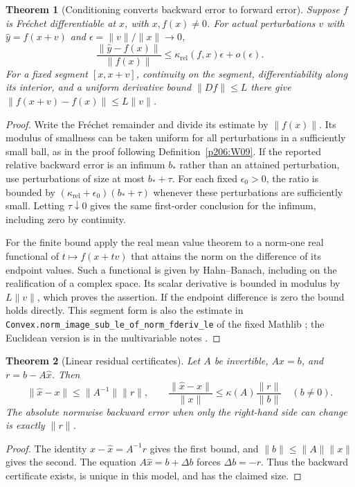 \documentclass[11pt,oneside,openany]{book}
\theoremstyle{plain}
\newtheorem{theorem}{Theorem}[chapter]
\theoremstyle{definition}
\theoremstyle{remark}
\begin{document}
\begin{theorem}[Conditioning converts backward error to forward error]
\label{p206:W13}
Suppose \(f\) is Fr\'echet differentiable at \(x\), with
\(x,f(x)\ne0\). For actual perturbations \(v\) with
\(\hat y=f(x+v)\) and \(\epsilon=\|v\|/\|x\|\to0\),
\[
 \frac{\|\hat y-f(x)\|}{\|f(x)\|}
    \le \kappa_{\mathrm{rel}}(f,x)\epsilon+o(\epsilon).
\]
For a fixed segment \([x,x+v]\), continuity on the segment,
differentiability along its interior, and a uniform derivative
bound \(\|Df\|\le L\) there give
\(\|f(x+v)-f(x)\|\le L\|v\|\).
\end{theorem}
\begin{proof}
Write the Fr\'echet remainder and divide its estimate by
\(\|f(x)\|\). Its modulus of smallness can be taken uniform
for all perturbations in a sufficiently small ball, as in
the proof following Definition~\ref{p206:W09}.
If the reported relative backward error is an infimum \(b_*\)
rather than an attained perturbation, use perturbations of size
at most \(b_*+\tau\). For each fixed \(\epsilon_0>0\), the
ratio is bounded by
\((\kappa_{\mathrm{rel}}+\epsilon_0)(b_*+\tau)\)
whenever these perturbations are sufficiently small. Letting
\(\tau\downarrow0\) gives the same first-order conclusion for
the infimum, including zero by continuity.

For the finite bound apply the real mean value theorem to
a norm-one real functional of \(t\mapsto f(x+tv)\) that
attains the norm on the difference of its endpoint values.
Such a functional is given by Hahn--Banach, including on the
realification of a complex space. Its scalar derivative is
bounded in modulus by \(L\|v\|\), which proves the assertion.
If the endpoint difference is zero the bound holds directly.
This segment form is also the estimate in
\texttt{Convex.norm\_image\_sub\_le\_of\_norm\_fderiv\_le}
of the fixed Mathlib \cite{mathlib}; the Euclidean version
is in the multivariable notes \cite{d04}.
\end{proof}

\begin{theorem}[Linear residual certificates]\label{p206:W14}
Let \(A\) be invertible, \(Ax=b\), and \(r=b-A\hat x\).
Then
\[
 \|\hat x-x\|\le\|A^{-1}\|\|r\|,\qquad
 \frac{\|\hat x-x\|}{\|x\|}
      \le \kappa(A)\frac{\|r\|}{\|b\|}\quad (b\ne0).
\]
The absolute normwise backward error when only the right-hand side
can change is exactly \(\|r\|\).
\end{theorem}
\begin{proof}
The identity \(x-\hat x=A^{-1}r\) gives the first bound,
and \(\|b\|\le\|A\|\|x\|\) gives the second. The equation
\(A\hat x=b+\Delta b\) forces \(\Delta b=-r\).
Thus the backward certificate exists, is unique in this model,
and has the claimed size.
\end{proof}
\end{document}

